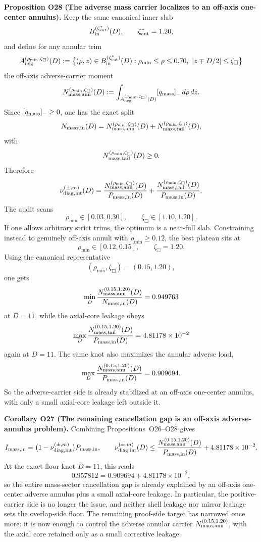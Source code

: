 \documentclass[aps,prd,onecolumn,notitlepage,nofootinbib,superscriptaddress,11pt,floatfix]{revtex4-2}
\begin{document}
\medskip\noindent\textbf{Proposition O28 (The adverse mass carrier localizes to an off-axis one-center annulus).}
Keep the same canonical inner slab
\[
B_{\rm in}^{(\zeta_{\rm cut}^{\ast})}(D),
\qquad
\zeta_{\rm cut}^{\ast}=1.20,
\]
and define for any annular trim
\[
A_{\rm neg}^{(\rho_{\min},\zeta_{\Box})}(D)
:=
\bigl\{(\rho,z)\in B_{\rm in}^{(\zeta_{\rm cut}^{\ast})}(D):
\rho_{\min}\le \rho\le 0.70,\ |z\mp D/2|\le \zeta_{\Box}\bigr\}
\]
the off-axis adverse-carrier moment
\[
N_{\rm mass,ann}^{(\rho_{\min},\zeta_{\Box})}(D)
:=
\int_{A_{\rm neg}^{(\rho_{\min},\zeta_{\Box})}(D)} [q_{\rm mass}]_-\,d\rho\,dz.
\]
Since \([q_{\rm mass}]_-\ge 0\), one has the exact split
\[
N_{\rm mass,in}(D)
=
N_{\rm mass,ann}^{(\rho_{\min},\zeta_{\Box})}(D)
+
N_{\rm mass,tail}^{(\rho_{\min},\zeta_{\Box})}(D),
\]
with
\[
N_{\rm mass,tail}^{(\rho_{\min},\zeta_{\Box})}(D)\ge 0.
\]
Therefore
\[
\nu_{\rm diag,int}^{(\pm,m)}(D)
=
\frac{N_{\rm mass,ann}^{(\rho_{\min},\zeta_{\Box})}(D)}{P_{\rm mass,in}(D)}
+
\frac{N_{\rm mass,tail}^{(\rho_{\min},\zeta_{\Box})}(D)}{P_{\rm mass,in}(D)}.
\]
The audit
scans
\[
\rho_{\min}\in[0.03,0.30],
\qquad
\zeta_{\Box}\in[1.10,1.20].
\]
If one allows arbitrary strict trims, the optimum is a near-full slab. Constraining instead to genuinely off-axis annuli with \(\rho_{\min}\ge 0.12\), the best plateau sits at
\[
\rho_{\min}\in[0.12,0.15],
\qquad
\zeta_{\Box}=1.20.
\]
Using the canonical representative
\[
(\rho_{\min},\zeta_{\Box})=(0.15,1.20),
\]
one gets
\[
\min_D
\frac{N_{\rm mass,ann}^{(0.15,1.20)}(D)}{N_{\rm mass,in}(D)}
=
0.949763
\]
at \(D=11\), while the axial-core leakage obeys
\[
\max_D
\frac{N_{\rm mass,tail}^{(0.15,1.20)}(D)}{P_{\rm mass,in}(D)}
=
4.81178\times10^{-2}
\]
again at \(D=11\). The same knot also maximizes the annular adverse load,
\[
\max_D
\frac{N_{\rm mass,ann}^{(0.15,1.20)}(D)}{P_{\rm mass,in}(D)}
=
0.909694.
\]
So the adverse-carrier side is already stabilized at an off-axis one-center annulus, with only a small axial-core leakage left outside it.

\medskip\noindent\textbf{Corollary O27 (The remaining cancellation gap is an off-axis adverse-annulus problem).}
Combining Propositions~O26--O28 gives
\[
I_{\rm mass,in}
=
\bigl(1-\nu_{\rm diag,int}^{(\pm,m)}\bigr)P_{\rm mass,in},
\qquad
\nu_{\rm diag,int}^{(\pm,m)}(D)
\le
\frac{N_{\rm mass,ann}^{(0.15,1.20)}(D)}{P_{\rm mass,in}(D)}
+
4.81178\times10^{-2}.
\]
At the exact floor knot \(D=11\), this reads
\[
0.957812
=
0.909694 + 4.81178\times10^{-2},
\]
so the entire mass-sector cancellation gap is already explained by an off-axis one-center adverse annulus plus a small axial-core leakage. In particular, the positive-carrier side is no longer the issue, and neither shell leakage nor mirror leakage sets the overlap-side floor. The remaining proof-side target has narrowed once more: it is now enough to control the adverse annular carrier \(N_{\rm mass,ann}^{(0.15,1.20)}\), with the axial core retained only as a small corrective leakage.
\end{document}
